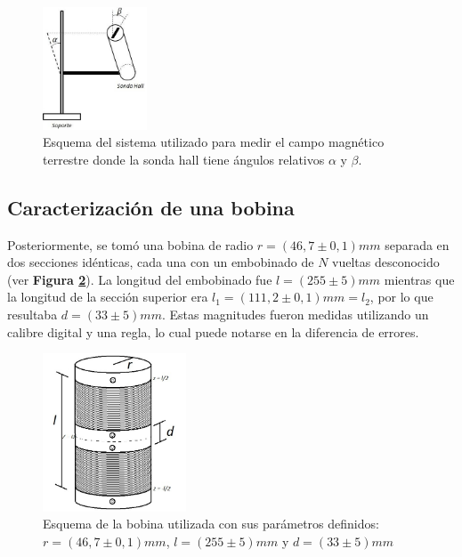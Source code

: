 \documentclass[11pt,a4paper]{article}
\begin{document}
\begin{figure}[h!]
\centering
   \includegraphics[width=0.275\textwidth]{Terrestre}
   \caption{Esquema del sistema utilizado para medir el campo magnético terrestre donde la sonda hall tiene ángulos relativos $\alpha$ y $\beta$.}  
   \label{fig:terrestre}
\end{figure}

\newpage

\subsection{Caracterización de una bobina}

Posteriormente, se tomó una bobina de radio $r = (46,7 \pm 0,1)mm$ separada en dos secciones idénticas, cada una con un embobinado de $N$ vueltas desconocido (ver \textbf{Figura \ref{fig:bobina}}). La longitud del embobinado fue $l = (255 \pm 5)mm$ mientras que la longitud de la sección superior era $l_1 = (111,2 \pm 0,1)mm = l_2$, por lo que resultaba $d = (33 \pm 5)mm$. Estas magnitudes fueron medidas utilizando un calibre digital y una regla, lo cual puede notarse en la diferencia de errores. 

\begin{figure}[h!]
\centering
   \includegraphics[width=0.38\textwidth]{Bobinaa}
   \caption{Esquema de la bobina utilizada con sus parámetros definidos: $r = (46,7 \pm 0,1)mm$, $l = (255 \pm 5)mm$ y $d = (33 \pm 5)mm$}  
   \label{fig:bobina}
\end{figure}
\end{document}
